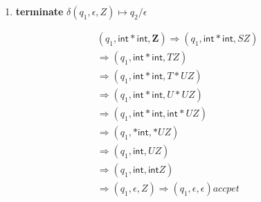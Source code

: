 {\begin{minipage}[t]{0.4\linewidth}
\begin{enumerate}[resume,start=3]
\begin{align*}
  \delta&(q_{1},\mathbf{(},\mathbf{(})& \mapsto &\quad q_{1}/\epsilon\\
  \delta&(q_{1},\mathbf{)},\mathbf{)})& \mapsto &\quad q_{1}/\epsilon
  \end{align*}
\item \textbf{terminate} $\delta(q_{1},\epsilon,Z) \mapsto q_{2}/\epsilon$
\end{enumerate}
\end{minipage}
\begin{minipage}[t]{0.55\linewidth}
\setlength{\abovedisplayskip}{-1em}
\setlength{\belowdisplayskip}{0pt}
  \begin{align*}
    & (q_{1},\mathsf{int * int}, \mathbf{Z}) \Rightarrow (q_{1}, \mathsf{int * int}, SZ)\\
    &\Rightarrow (q_{1}, \mathsf{int * int}, TZ)\\
    &\Rightarrow (q_{1}, \mathsf{int * int}, T*UZ)\\
    &\Rightarrow (q_{1}, \mathsf{int * int}, U*UZ)\\
    &\Rightarrow (q_{1}, \mathsf{int * int}, \mathsf{int}*UZ)\\
    &\Rightarrow (q_{1}, \mathsf{ * int}, *UZ)\\
    &\Rightarrow (q_{1}, \mathsf{int}, UZ)\\
    &\Rightarrow (q_{1}, \mathsf{int}, \mathsf{int}Z)\\
    &\Rightarrow (q_{1}, \epsilon, Z) \Rightarrow (q_{1}, \epsilon, \epsilon) accpet\\
  \end{align*}
\end{minipage}
}
